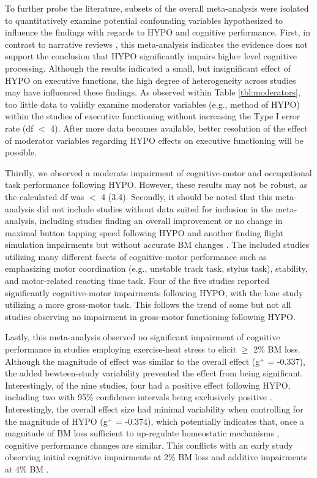 To further probe the literature, subsets of the overall meta-analysis were isolated to quantitatively examine potential confounding variables hypothesized to influence the findings with regards to HYPO and cognitive performance. First, in contrast to narrative reviews \cite{lieberman_hydration_2007,grandjean_dehydration_2007}, this meta-analysis indicates the evidence does not support the conclusion that HYPO significantly impairs higher level cognitive processing. Although the results indicated a small, but insignificant effect of HYPO on executive functions, the high degree of heterogeneity across studies may have influenced these findings. As observed within Table \ref{tbl:moderators}, too little data to validly examine moderator variables  (e.g., method of HYPO) within the studies of executive functioning without increasing the Type I error rate (df ${<}$ 4). After more data becomes available, better resolution of the effect of moderator variables regarding HYPO effects on executive functioning will be possible.  

Thirdly, we observed a moderate impairment of cognitive-motor and occupational task performance following HYPO. However, these results may not be robust, as the calculated df was ${<}$ 4 (3.4). Secondly, it should be noted that this meta-analysis did not include studies without data suited for inclusion in the meta-analysis, including studies finding an overall improvement \cite{bandelow_effects_2010} or no change \cite{hogervorst_cognitive_1996} in maximal button tapping speed following HYPO and another finding flight simulation impairments but without accurate BM changes \cite{lindseth_effects_2013}. The included studies utilizing many different facets of cognitive-motor performance such as emphasizing motor coordination (e.g., unstable track task, stylus task), stability, and motor-related reacting time task. Four of the five studies reported significantly cognitive-motor impairments following HYPO, with the lone study utilizing a more gross-motor task. This follows the trend of some \cite{savoie_effect_2015} but not all \cite{baker_progressive_2007} studies observing no impairment in gross-motor functioning following HYPO. 

Lastly, this meta-analysis observed no significant impairment of cognitive performance in studies employing exercise-heat stress to elicit ${\ge}$ 2\% BM loss. Although the magnitude of effect was similar to the overall effect (g${^+}$ = -0.337), the added bewteen-study variability prevented the effect from being significant. Interestingly, of the nine studies, four had a positive effect following HYPO, including two with 95\% confidence intervals being exclusively positive \cite{danci_voluntary_2009,bijlani_effect_1980}. Interestingly, the overall effect size had minimal variability when controlling for the magnitude of HYPO (g${^+}$ = -0.374), which potentially indicates that, once a magnitude of BM loss sufficient to up-regulate homeostatic mechanisms  \cite{sawka_american_2007,cheuvront_dehydration:_2014}, cognitive performance changes are similar. This conflicts with an early study observing initial cognitive impairments at 2\% BM loss and additive impairments at 4\% BM \cite{gopinathan_role_1988}.  



